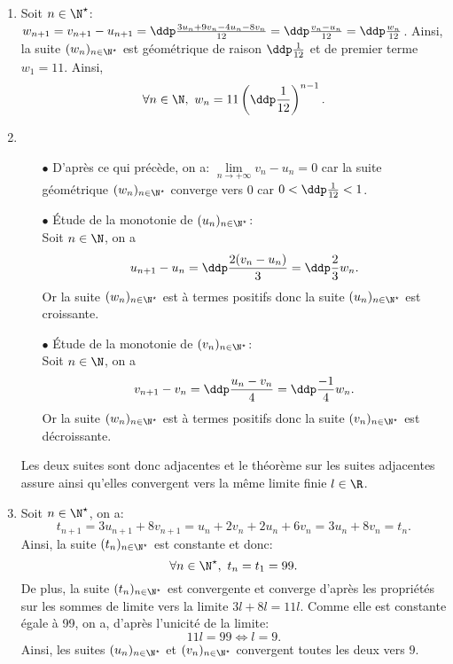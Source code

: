 \begin{correction}
\begin{enumerate}
 \item Soit $n\in\N^{\star}$: $w_{n+1}=v_{n+1}-u_{n+1}=\ddp\frac{3u_n+9v_n-4u_n-8v_n}{12}=\ddp\frac{v_n-u_n}{12}=
\ddp\frac{w_n}{12}$. Ainsi, la suite 
$(w_n)_{n\in\N^{\star}}$ est g\'eom\'etrique de raison $\ddp\frac{1}{12}$ et de premier terme $w_1=11$. Ainsi,
$$\forall n\in\N,\ w_n=11\left( \ddp\frac{1}{12} \right)^{n-1}.$$
\item \begin{itemize}
\item[$\bullet$] D'apr\`es ce qui pr\'ec\`ede, on a: $\lim\limits_{n\to +\infty} v_n-u_n=0$ car la suite g\'eom\'etrique $(w_n)_{n\in\N^{\star}}$ converge vers 0 car $0<\ddp\frac{1}{12}<1$.
\item[$\bullet$]  \'Etude de la monotonie de $(u_n)_{n\in\N^{\star}}$:\\
\noindent Soit $n\in\N$, on a
$$u_{n+1}-u_n=\ddp\frac{2(v_n-u_n)}{3}=\ddp\frac{2}{3}w_n.$$
Or la suite $(w_n)_{n\in\N^{\star}}$ est \`a termes positifs donc la suite $(u_n)_{n\in\N^{\star}}$ est croissante.
\item[$\bullet$]  \'Etude de la monotonie de $(v_n)_{n\in\N^{\star}}$:\\
\noindent Soit $n\in\N$, on a
$$v_{n+1}-v_n=\ddp\frac{u_n-v_n}{4}=\ddp\frac{-1}{4}w_n.$$
Or la suite $(w_n)_{n\in\N^{\star}}$ est \`a termes positifs donc la suite $(v_n)_{n\in\N^{\star}}$ est d\'ecroissante.
      \end{itemize}
Les deux suites sont donc adjacentes et le th\'eor\`eme sur les suites adjacentes assure ainsi qu'elles convergent vers la m\^eme limite finie $l\in\R$.
\item Soit $n\in\N^{\star}$, on a:
$$t_{n+1}=3u_{n+1}+8v_{n+1}= u_n+2v_n+2u_n+6v_n=3u_n+8v_n=t_n.$$
Ainsi, la suite $(t_n)_{n\in\N^{\star}}$ est constante et donc:
$$\forall n\in\N^{\star},\ t_n=t_1=99.$$
De plus, la suite $(t_n)_{n\in\N^{\star}}$ est convergente et converge d'apr\`es les propri\'et\'es sur les sommes de limite vers la limite $3l+8l=11l$. Comme elle est constante \'egale \`a 99, on a, d'apr\`{e}s l'unicit\'e de la limite:
$$11l=99\Leftrightarrow l=9.$$
Ainsi, les suites $(u_n)_{n\in\N^{\star}}$ et $(v_n)_{n\in\N^{\star}}$ convergent toutes les deux vers $9$.
\end{enumerate}
\end{correction}
